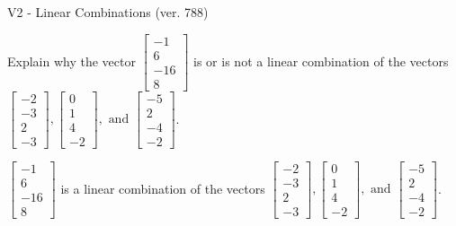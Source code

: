 \begin{exercise}
  \begin{exerciseTitle}V2 - Linear Combinations (ver. 788)\end{exerciseTitle}
  \begin{exerciseStatement}
    Explain why the vector \(\left[\begin{array}{c}
-1 \\
6 \\
-16 \\
8
\end{array}\right]\)  is or is not a linear 
	combination of the vectors \(\left[\begin{array}{c}
-2 \\
-3 \\
2 \\
-3
\end{array}\right] , \left[\begin{array}{c}
0 \\
1 \\
4 \\
-2
\end{array}\right] , \text{ and } \left[\begin{array}{c}
-5 \\
2 \\
-4 \\
-2
\end{array}\right]\).
	


  \end{exerciseStatement}
  \begin{exerciseAnswer}
   \(\left[\begin{array}{c}
-1 \\
6 \\
-16 \\
8
\end{array}\right]\) 
  	 is  
	a linear combination of the vectors \(\left[\begin{array}{c}
-2 \\
-3 \\
2 \\
-3
\end{array}\right] , \left[\begin{array}{c}
0 \\
1 \\
4 \\
-2
\end{array}\right] , \text{ and } \left[\begin{array}{c}
-5 \\
2 \\
-4 \\
-2
\end{array}\right]\).

	
  


  \end{exerciseAnswer}
\end{exercise}